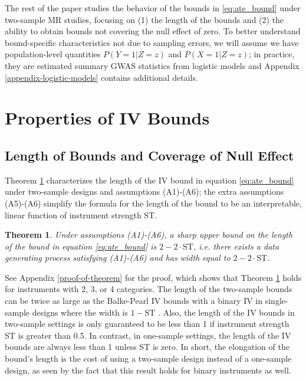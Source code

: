 \documentclass[
]{article}
\theoremstyle{plain}
\newtheorem{theorem}{Theorem}[section]
\begin{document}
The rest of the paper studies the behavior of the bounds in \eqref{eq:ate_bound} under two-sample MR studies, focusing on (1) the length of the bounds and (2) the ability to obtain bounds not covering the null effect of zero. To better understand bound-specific characteristics not due to sampling errors, we will assume we have population-level quantities \(P(Y = 1 | Z = z)\) and \(P(X = 1 | Z = z)\); in practice, they are estimated summary GWAS statistics from logistic models \autocite{lawlor_mendelian_2008,burgess_sample_2014,verma_simulation_2018,millard_mr-phewas_2019,king_mendelian_2020} and Appendix \ref{appendix-logistic-models} contains additional details.

\hypertarget{properties-of-iv-bounds}{%
\section{Properties of IV Bounds}\label{properties-of-iv-bounds}}

\hypertarget{length-of-bounds-and-coverage-of-null-effect}{%
\subsection{Length of Bounds and Coverage of Null Effect}\label{length-of-bounds-and-coverage-of-null-effect}}

\label{bounds-from-bivariate-data}
\label{properties-of-bounds-from-summary-level-data}

Theorem \ref{thm:upperBoundWidth} characterizes the length of the IV bound in equation \eqref{eq:ate_bound} under two-sample designs and assumptions (A1)-(A6); the extra assumptions (A5)-(A6) simplify the formula for the length of the bound to be an interpretable, linear function of instrument strength ST.

\begin{theorem}\label{thm:upperBoundWidth}
Under assumptions (A1)-(A6), a sharp upper bound on the length of the bound in equation \eqref{eq:ate_bound} is $2 - 2\cdot \text{ST}$, i.e. there exists a data generating process satisfying (A1)-(A6) and has width equal to $2 - 2\cdot \text{ST}$.
\end{theorem}

See Appendix \ref{proof-of-theorem} for the proof, which shows that Theorem \ref{thm:upperBoundWidth} holds for instruments with 2, 3, or 4 categories. The length of the two-sample bounds can be twice as large as the Balke-Pearl IV bounds with a binary IV in single-sample designs where the width is \(1-\text{ST}\) \autocite{balke_bounds_1997}. Also, the length of the IV bounds in two-sample settings is only guaranteed to be less than 1 if instrument strength ST is greater than 0.5. In contrast, in one-sample settings, the length of the IV bounds are always less than 1 unless ST is zero. In short, the elongation of the bound's length is the cost of using a two-sample design instead of a one-sample design, as seen by the fact that this result holds for binary instruments as well.
\end{document}
